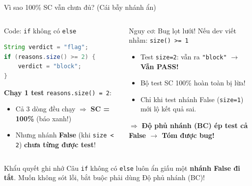 \documentclass[aspectratio=169,12pt]{beamer}
\begin{document}
\begin{frame}[fragile,shrink=5]{Vì sao 100\% SC vẫn chưa đủ? (Cái bẫy nhánh ẩn)}
  \begin{columns}[T]
    \begin{exampleblock}{\small Code: \texttt{if} không có \texttt{else}}
\begin{lstlisting}[language=java,style=nonumber]
String verdict = "flag";
if (reasons.size() >= 2) {
    verdict = "block";
}
\end{lstlisting}
      \small
      \textbf{Chạy 1 test} \texttt{reasons.size() = 2}:
      \begin{itemize}\footnotesize
        \item Cả 3 dòng đều chạy $\Rightarrow$ \textbf{SC = 100\%} (báo xanh!)
        \item Nhưng nhánh \textbf{False} (khi \texttt{size < 2}) \textbf{chưa từng được test}!
      \end{itemize}
    \end{exampleblock}

    \begin{alertblock}{\small Nguy cơ: Bug lọt lưới!}
      \small
      Nếu dev viết nhầm: \texttt{size() >= 1}
      \begin{itemize}\footnotesize
        \item Test \texttt{size=2}: vẫn ra \texttt{"block"} $\to$ \textbf{Vẫn PASS!}
        \item Bộ test SC 100\% hoàn toàn bị lừa!
        \item Chỉ khi test nhánh False (\texttt{size=1}) mới lộ kết quả sai.
      \end{itemize}
      $\Rightarrow$ \textbf{Độ phủ nhánh (BC) ép test cả False $\to$ Tóm được bug!}
    \end{alertblock}
  \end{columns}

  \vspace{0.2em}
  \begin{block}{\small Khẩu quyết ghi nhớ}
    \footnotesize Câu \texttt{if} không có \texttt{else} luôn ẩn giấu một \textbf{nhánh False đi tắt}. Muốn không sót lỗi, bắt buộc phải dùng Độ phủ nhánh (BC)!
  \end{block}
\end{frame}
\end{document}
